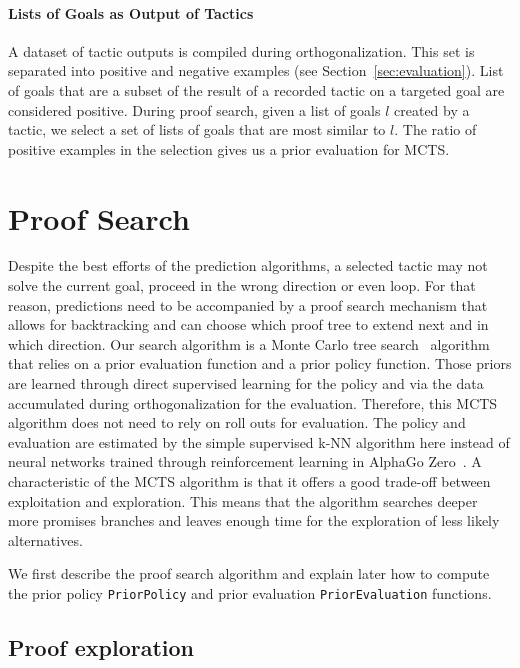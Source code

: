\documentclass[runningheads,a4paper,draft]{svjour3}
\begin{document}
\paragraph{Lists of Goals as Output of Tactics}
A dataset of tactic outputs is compiled during orthogonalization.
This set is separated into positive and negative examples (see
Section~\ref{sec:evaluation}).
List of goals that are a subset of the result of a recorded tactic on a
targeted goal are considered positive. During proof search, given a list of
goals $l$ created by a tactic, we select a set of lists of goals that are most
similar to $l$. The ratio of positive examples in the selection gives us a
prior evaluation for MCTS.

\section{Proof Search}\label{sec:proofsearch}

Despite the best efforts of the prediction algorithms, a selected tactic may
not solve the current goal, proceed in the wrong direction
or even loop. For that reason, predictions need to be accompanied by a
proof search mechanism that allows for backtracking and
can choose which proof tree to extend next and in which direction.
Our search algorithm is a Monte Carlo tree search~\cite{montecarlo} algorithm
that relies
on a prior evaluation function and a prior policy function. Those priors are
learned through direct supervised learning for the policy and via the data
accumulated during orthogonalization for the evaluation. Therefore, this MCTS
algorithm does not need to rely on roll outs for evaluation. The
policy and evaluation are estimated by the simple supervised k-NN algorithm
here instead of neural networks trained through reinforcement learning in
AlphaGo Zero~\cite{silver2017mastering}.
A characteristic of the MCTS algorithm is that it offers a good trade-off
between exploitation and exploration. This means that the algorithm searches
deeper more promises branches and leaves enough time for the exploration
of less likely alternatives.


We first describe the proof search algorithm and explain later how to compute
the prior policy \texttt{PriorPolicy} and prior evaluation
\texttt{PriorEvaluation} functions.

\subsection{Proof exploration}
\end{document}
